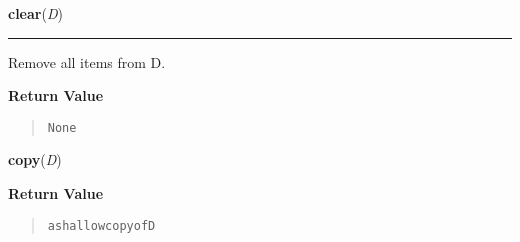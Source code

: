     \label{dict:clear}

    \vspace{0.5ex}

    \begin{boxedminipage}{\textwidth}

    \raggedright \textbf{clear}(\textit{D})

    \vspace{-1.5ex}

    \rule{\textwidth}{0.5\fboxrule}
    Remove all items from D.

    \vspace{1ex}

      \textbf{Return Value}
      \begin{quote}
\begin{alltt}
None
\end{alltt}

      \end{quote}

    \vspace{1ex}

    \end{boxedminipage}

    \label{dict:copy}

    \vspace{0.5ex}

    \begin{boxedminipage}{\textwidth}

    \raggedright \textbf{copy}(\textit{D})

      \textbf{Return Value}
      \begin{quote}
\begin{alltt}
a shallow copy of D
\end{alltt}

      \end{quote}

    \vspace{1ex}

    \end{boxedminipage}

    \label{dict:fromkeys}

    \vspace{0.5ex}

